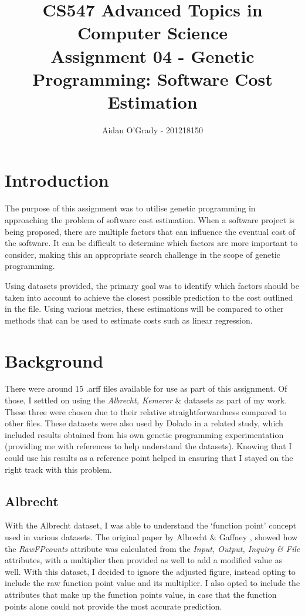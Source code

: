 \documentclass[11pt, a4paper]{article}
\begin{document}
\title{CS547 Advanced Topics in Computer Science\\
\large{Assignment 04 - Genetic Programming: Software Cost Estimation}}
\author{Aidan O'Grady - 201218150}
\date{}
\maketitle
\section{Introduction} %
\label{sec:introduction}
The purpose of this assignment was to utilise genetic programming in approaching
the problem of software cost estimation. When a software project is being
proposed, there are multiple factors that can influence the eventual cost of the
software. It can be difficult to determine which factors are more important to
consider, making this an appropriate search challenge in the scope of genetic
programming.

Using datasets provided, the primary goal was to identify which factors should
be taken into account to achieve the closest possible prediction to the cost
outlined in the file. Using various metrics, these estimations will be compared
to other methods that can be used to estimate costs such as linear regression.

\section{Background} %
\label{sec:background}
There were around 15 .arff files available for use as part of this assignment.
Of those, I settled on using the \emph{Albrecht, Kemerer} \& 
datasets as part of my work. These three were chosen due to their relative
straightforwardness compared to other files. These datasets were also used by
Dolado \cite{Dolado200161} in a related study, which included results obtained
from his own genetic programming experimentation (providing me with references
to help understand the datasets). Knowing that I could use his results as a
reference point helped in ensuring that I stayed on the right track with this
problem.

\subsection{Albrecht} %
\label{sub:albrecht}
With the Albrecht dataset, I was able to understand the `function point' concept
used in various datasets. The original paper by Albrecht \& Gaffney
\cite{1703110}, showed how the \emph{RawFPcounts} attribute was calculated
from the \emph{Input, Output, Inquiry \& File} attributes, with a multiplier
then provided as well to add a modified value as well. With this dataset, I
decided to ignore the adjusted figure, instead opting to include the raw
function point value and its multiplier. I also opted to include the attributes
that make up the function points value, in case that the function points alone
could not provide the most accurate prediction.
\end{document}
